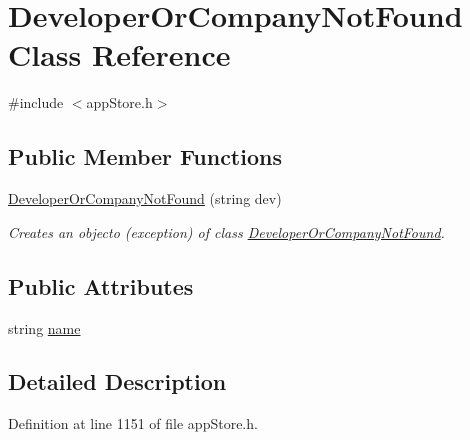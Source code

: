 \hypertarget{class_developer_or_company_not_found}{\section{Developer\-Or\-Company\-Not\-Found Class Reference}
\label{class_developer_or_company_not_found}
}


{\ttfamily \#include $<$app\-Store.\-h$>$}

\subsection*{Public Member Functions}
\begin{DoxyCompactItemize}
\item 
\hyperlink{class_developer_or_company_not_found_a536f04bc22524004becded3d2892f51c}{Developer\-Or\-Company\-Not\-Found} (string dev)
\begin{DoxyCompactList}\small\item\em Creates an objecto (exception) of class \hyperlink{class_developer_or_company_not_found}{Developer\-Or\-Company\-Not\-Found}. \end{DoxyCompactList}\end{DoxyCompactItemize}
\subsection*{Public Attributes}
\begin{DoxyCompactItemize}
\item 
string \hyperlink{class_developer_or_company_not_found_a40d39b6538dad36a237fbabfb73dea9a}{name}
\end{DoxyCompactItemize}


\subsection{Detailed Description}


Definition at line 1151 of file app\-Store.\-h.



